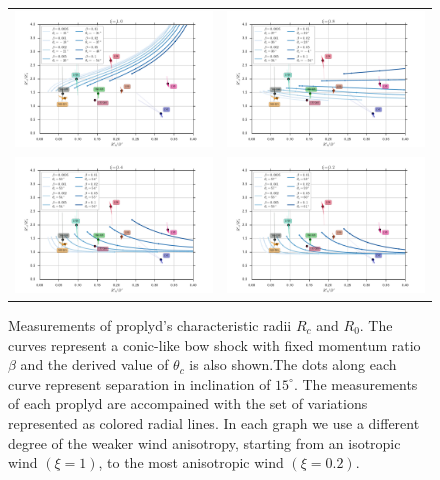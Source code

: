 

 

\begin{figure}
\begin{tabular}{cc}
\includegraphics[width=0.48\linewidth]{../../read-shapes/conic_xi-10} & \includegraphics[width=0.48\linewidth]{../../read-shapes/conic_xi-08} \\
\includegraphics[width=0.48\linewidth]{../../read-shapes/conic_xi-04} & \includegraphics[width=0.48\linewidth]{../../read-shapes/conic_xi-02} 
\end{tabular}
\label{fig:conic-xi}
\caption{Measurements of proplyd's characteristic radii $R_c$ and $R_0$. The curves represent a conic-like bow shock with 
fixed momentum ratio $\beta$ and the derived value of $\theta_c$ is also shown.The dots along each curve represent separation in inclination of 
$15^\circ$. The measurements of each proplyd are accompained with the set of variations represented as colored radial lines. In 
each graph we use a different degree of the weaker wind anisotropy, starting from an isotropic wind $(\xi=1)$, to the most anisotropic wind
$(\xi=0.2)$.}
\end{figure}
